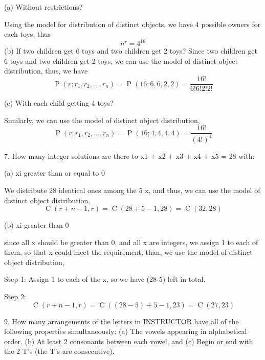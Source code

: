\documentclass[12pt]{amsart}
\DeclareMathOperator{\perm}{P}
\DeclareMathOperator{\comb}{C}
\begin{document}
(a) Without restrictions?
\smallskip

Using the model for distribution of distinct objects, we have 4 possible owners for each toys, thus
\begin{displaymath}
n^r= 4^{16}
\end{displaymath}
(b) If two children get 6 toys and two children get 2 toys?
Since two children get 6 toys and two children get 2 toys, we can use the model of distinct object distribution, thus, we have 
\begin{displaymath}
\perm(r;r_1,r_2,...,r_n) = \perm (16; 6,6,2,2) = \frac{16!}{6!6!2!2!}
\end{displaymath}

(c) With each child getting 4 toys?
\bigskip

Similarly, we can use the model of distinct object distribution, 
\begin{displaymath}
\perm(r;r_1,r_2,...,r_n) = \perm (16; 4,4,4,4) = \frac{16!}{(4!)^4}
\end{displaymath}
\bigskip

7. How many integer solutions are there to x1 + x2 + x3 + x4 + x5 = 28 with:
\smallskip 

(a) xi greater than or equal to 0
\smallskip

We distribute 28 identical ones among the 5 x, and thus, we can use the model of distinct object distribution,
\begin{displaymath}
\comb(r+n-1,r)= \comb(28+5-1,28) = \comb(32,28) 
\end{displaymath}
\smallskip

(b) xi greater than 0
\smallskip

since all x should be greater than 0, and all x are integers, we assign 1 to each of them, so that x could meet the requirement, than, we use the model of distinct object distribution, 
\smallskip

Step 1: Assign 1 to each of the x, so we have (28-5) left in total.
\smallskip

Step 2:
\begin{displaymath}
\comb(r+n-1,r)= \comb((28-5)+5-1,23) = \comb(27,23) 
\end{displaymath}
\bigskip

9. How many arrangements of the letters in INSTRUCTOR have all of the following
properties simultaneously:
(a) The vowels appearing in alphabetical order.
(b) At least 2 consonants between each vowel, and
(c) Begin or end with the 2 T’s (the T’s are consecutive).
\smallskip
\end{document}
